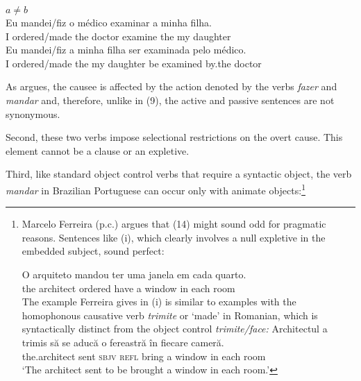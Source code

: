 \documentclass[output=paper]{langsci/langscibook}
\begin{document}
\ea%
           $a \neq b$\label{ex:moreno:10}\\
    \ea
    \gll Eu   mandei/fiz      o    médico   examinar  a    minha filha.\\
         I         ordered/made the doctor     examine    the my     daughter\\
    \ex  
    \gll Eu   mandei/fiz    a     minha filha      ser examinada pelo    médico.\\
         I         ordered/made the  my      daughter  be examined    by.the doctor\\
    \z
\z    

As \citet{Farrell1995} argues, the causee is affected by the action denoted by the verbs \textit{fazer} and \textit{mandar} and, therefore, unlike in (9), the active and passive sentences are not synonymous.

Second, these two verbs impose selectional restrictions on the overt cause. This element cannot be a clause or an expletive. 

    \z



\z

Third, like standard object control verbs that require a syntactic object, the verb \textit{mandar} in Brazilian Portuguese can occur only with animate objects:\footnote{Marcelo Ferreira (p.c.) argues that (14) might sound odd for pragmatic reasons. Sentences like (i), which clearly involves a null expletive in the~ embedded subject, sound perfect:

\ea \gll  O   arquiteto mandou   ter    uma janela    em cada quarto.\\
the architect  ordered   have a      window in  each  room\\
\z The example Ferreira gives in (i) is similar to examples with the homophonous causative verb \textit{trimite} or ‘made’ in Romanian, which is syntactically distinct from the object control \textit{trimite\slash face:}
\ea \gll Architectul   {a trimis} să     se    aducă       o fereastră în fiecare cameră.\\
         the.architect sent       \textsc{sbjv} \textsc{refl} bring a window   in each room\\
    \glt ‘The architect sent to be brought a window in each room.’
\z}
\end{document}
